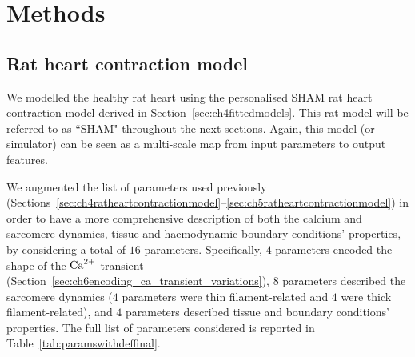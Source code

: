 %
%
%
\section{Methods}\label{sec:ch7methods}


%
%
%
\subsection{Rat heart contraction model}\label{sec:ratmodel}
We modelled the healthy rat heart using the personalised SHAM rat heart contraction model derived in Section~\ref{sec:ch4fittedmodels}. This rat model will be referred to as ``SHAM" throughout the next sections. Again, this model (or simulator) can be seen as a multi-scale map from input parameters to output features.


\vspace{0.2cm}
We augmented the list of parameters used previously (Sections~\ref{sec:ch4ratheartcontractionmodel}--\ref{sec:ch5ratheartcontractionmodel}) in order to have a more comprehensive description of both the calcium and sarcomere dynamics, tissue and haemodynamic boundary conditions' properties, by considering a total of $16$ parameters. Specifically, $4$ parameters encoded the shape of the $\textrm{Ca}^{2+}$ transient (Section~\ref{sec:ch6encoding_ca_transient_variations}), $8$ parameters described the sarcomere dynamics ($4$ parameters were thin filament-related and $4$ were thick filament-related), and $4$ parameters described tissue and boundary conditions' properties. The full list of parameters considered is reported in Table~\ref{tab:paramswithdeffinal}.


